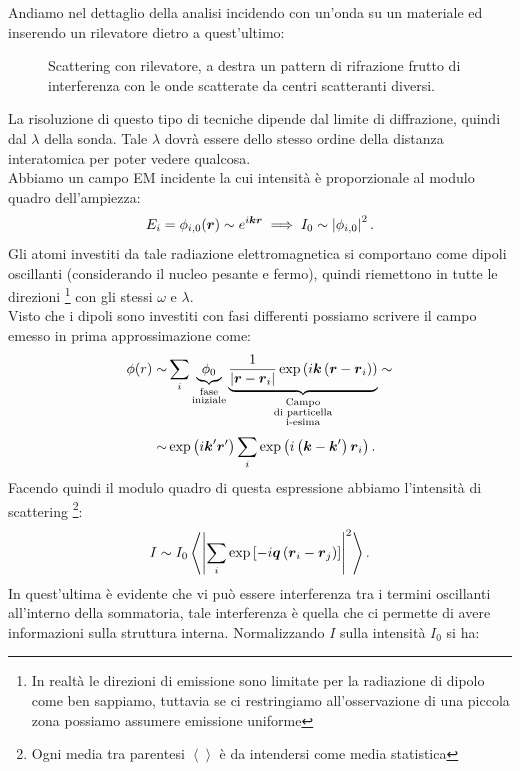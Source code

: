 Andiamo nel dettaglio della analisi incidendo con un'onda su un materiale ed inserendo un rilevatore dietro a quest'ultimo:
\begin{figure}[H]
    \centering
    \caption{\scriptsize Scattering con rilevatore, a destra un pattern di rifrazione frutto di interferenza con le onde scatterate da centri scatteranti diversi.}
    \label{fig:scattering-con-rilevatore}
\end{figure}
\noindent
La risoluzione di questo tipo di tecniche dipende dal limite di diffrazione, quindi dal $\lambda$ della sonda. Tale $\lambda$ dovrà essere dello stesso ordine della distanza interatomica per poter vedere qualcosa.\\
Abbiamo un campo EM incidente la cui intensità è proporzionale al modulo quadro dell'ampiezza:
\[
	E_i = \phi_{i,0}(\boldsymbol{r}) \sim e^{i \boldsymbol{k}\boldsymbol{r}} \implies I_0 \sim \left| \phi_{i,0} \right| ^2
.\] 
Gli atomi investiti da tale radiazione elettromagnetica si comportano come dipoli oscillanti (considerando il nucleo pesante e fermo), quindi riemettono in tutte le direzioni \footnote{In realtà le direzioni di emissione sono limitate per la radiazione di dipolo come ben sappiamo, tuttavia se ci restringiamo all'osservazione di una piccola zona possiamo assumere emissione uniforme} con gli stessi $\omega $ e $\lambda$.\\
Visto che i dipoli sono investiti con fasi differenti possiamo scrivere il campo emesso in prima approssimazione come:
\[\begin{aligned}
	\phi(r) \sim &
	\sum_{i}^{} 
	\underbrace{
	\phi_0 
	}_{\substack{\text{fase}\\ \text{iniziale}}}
	\underbrace{
	\frac{1}{\left| \boldsymbol{r}-\boldsymbol{r}_i \right|}
	\exp\left( i \boldsymbol{k}\left( \boldsymbol{r}-\boldsymbol{r}_i \right) \right) 
	}_{\substack{\text{Campo}\\ \text{di particella}\\ \text{i-esima}}} \sim\\ 
	\sim &
	\exp\left( i \boldsymbol{k}'\boldsymbol{r}' \right) \sum_{i}^{} \exp\left( i \left( \boldsymbol{k}-\boldsymbol{k}' \right) \boldsymbol{r}_i \right) 
.\end{aligned}\]
Facendo quindi il modulo quadro di questa espressione abbiamo l'intensità di scattering \footnote{Ogni media tra parentesi $\left< \right>$ è da intendersi come media statistica}:
\[
	I \sim I_0 \left< \left| \sum_{i}^{} \exp \left[ - i \boldsymbol{q}\left( \boldsymbol{r}_i - \boldsymbol{r}_j \right)  \right]  \right|^2  \right>
.\] 
In quest'ultima è evidente che vi può essere interferenza tra i termini oscillanti all'interno della sommatoria, tale interferenza è quella che ci permette di avere informazioni sulla struttura interna. Normalizzando $I$ sulla intensità $I_0$ si ha:
